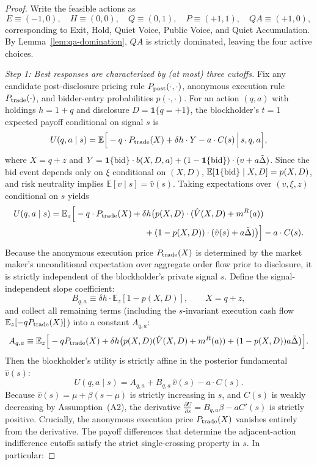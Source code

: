 \documentclass[11pt]{article}
\newcommand{\E}{\mathbb{E}}
\newcommand{\1}{\mathbf{1}}
\begin{document}
\begin{proof}
Write the feasible actions as
\[
E\equiv(-1,0),\quad H\equiv(0,0),\quad Q\equiv(0,1),\quad P\equiv(+1,1), \quad QA\equiv(+1,0),
\]
corresponding to Exit, Hold, Quiet Voice, Public Voice, and Quiet Accumulation. By Lemma~\ref{lem:qa-domination}, $QA$ is strictly dominated, leaving the four active choices.

\textit{Step 1: Best responses are characterized by (at most) three cutoffs.}
Fix any candidate post-disclosure pricing rule $P_{\textup{post}}(\cdot,\cdot)$, anonymous execution rule $P_{\textup{trade}}(\cdot)$, and bidder-entry probabilities $p(\cdot,\cdot)$. For an action $(q,a)$ with holdings $h=1+q$ and disclosure $D=\1\{q=+1\}$, the blockholder's $t=1$ expected payoff conditional on signal $s$ is
\[
U(q,a \mid s)
= \E\Big[-q\cdot P_{\textup{trade}}(X) + \delta h \cdot Y - a\cdot C(s) \,\Big|\, s,q,a\Big],
\]
where $X=q+z$ and $Y=\1\{\textup{bid}\}\cdot b(X,D,a) + (1-\1\{\textup{bid}\})\cdot (v+a\tilde{\Delta})$.
Since the bid event depends only on $\xi$ conditional on $(X,D)$, $\E[\1\{\textup{bid}\} \mid X,D]=p(X,D)$, and risk neutrality implies $\E[v \mid s]=\hat v(s)$. Taking expectations over $(v,\xi,z)$ conditional on $s$ yields
\begin{align*}
U(q,a \mid s)
&= \E_z\Big[-q\cdot P_{\textup{trade}}(X) + \delta h \big(p(X,D)\cdot (\hat{V}(X,D)+m^{R}(a)) \\
&\qquad\qquad\qquad\qquad\qquad\quad + (1-p(X,D))\cdot(\hat{v}(s)+a\tilde{\Delta})\big)\Big] - a\cdot C(s).
\end{align*}
Because the anonymous execution price $P_{\textup{trade}}(X)$ is determined by the market maker's unconditional expectation over aggregate order flow prior to disclosure, it is strictly independent of the blockholder's private signal $s$. Define the signal-independent slope coefficient:
\[
B_{q,a}\equiv \delta h\cdot \E_z[1-p(X,D)],\qquad X=q+z,
\]
and collect all remaining terms (including the $s$-invariant execution cash flow $\E_z[-q P_{\textup{trade}}(X)]$) into a constant $A_{q,a}$:
\[
A_{q,a} \equiv \E_z\Big[-q P_{\textup{trade}}(X) + \delta h \big( p(X,D)(\hat{V}(X,D) + m^R(a)) + (1-p(X,D))a\tilde{\Delta} \big)\Big].
\]
Then the blockholder's utility is strictly affine in the posterior fundamental $\hat{v}(s)$:
\begin{equation}
U(q,a \mid s)=A_{q,a}+B_{q,a}\,\hat{v}(s)-a\cdot C(s).
\label{eq:U-affine}
\end{equation}
Because $\hat v(s)=\mu+\beta(s-\mu)$ is strictly increasing in $s$, and $C(s)$ is weakly decreasing by Assumption~\textup{(A2)}, the derivative $\frac{\partial U}{\partial s} = B_{q,a}\beta - a C'(s)$ is strictly positive. Crucially, the anonymous execution price $P_{\textup{trade}}(X)$ vanishes entirely from the derivative. The payoff differences that determine the adjacent-action indifference cutoffs satisfy the strict single-crossing property in $s$. In particular:

\end{proof}
\end{document}
